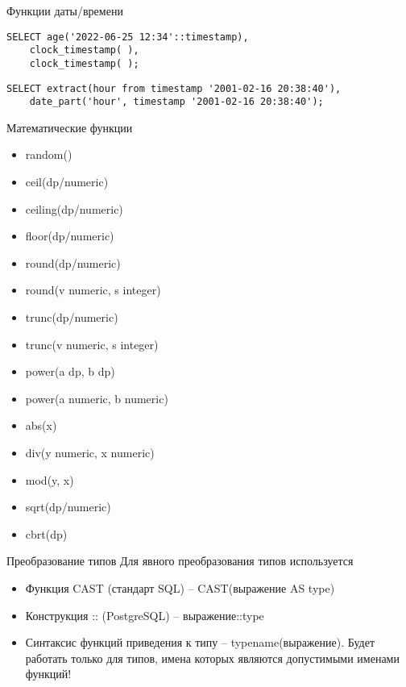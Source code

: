 \documentclass[12pt]{article}
\begin{document}
\begin{Example}{Функции даты/времени}
\begin{lstlisting}
SELECT age('2022-06-25 12:34'::timestamp),
    clock_timestamp( ),
    clock_timestamp( );
\end{lstlisting}

\begin{lstlisting}
SELECT extract(hour from timestamp '2001-02-16 20:38:40'),
    date_part('hour', timestamp '2001-02-16 20:38:40');
\end{lstlisting}
\end{Example}

\begin{nota}{Математические функции}
    \begin{itemize}
        \item random()
        \item ceil(dp/numeric)
        \item ceiling(dp/numeric)
        \item floor(dp/numeric)
        \item round(dp/numeric)
        \item round(v numeric, s integer)
        \item trunc(dp/numeric)
        \item trunc(v numeric, s integer)
        \item power(a dp, b dp)
        \item power(a numeric, b numeric)
        \item abs(x)
        \item div(y numeric, x numeric)
        \item mod(y, x)
        \item sqrt(dp/numeric)
        \item cbrt(dp)
    \end{itemize}
\end{nota}

\begin{defin}{Преобразование типов}
    Для явного преобразования типов используется 

    \begin{itemize}
        \item Функция CAST (стандарт SQL) -- CAST(выражение AS type)
        \item Конструкция :: (PostgreSQL) -- выражение::type
        \item Синтаксис функций приведения к типу -- typename(выражение). Будет работать только для типов, имена которых являются допустимыми именами функций!
    \end{itemize}
\end{defin}
\end{document}

